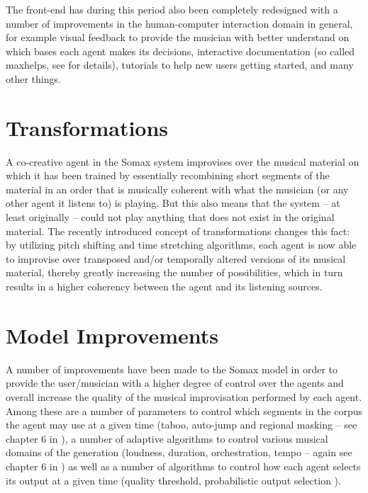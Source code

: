 \documentclass[10pt]{article}        %
\begin{document}
The front-end has during this period also been completely redesigned with a number of improvements in the human-computer interaction domain in general, for example visual feedback to provide the musician with better understand on which bases each agent makes its decisions, interactive documentation (so called maxhelps, see \cite{somaxsoftware2021} for details), tutorials to help new users getting started, and many other things.

\section{Transformations}
A co-creative agent in the Somax system improvises over the musical material on which it has been trained by essentially recombining short segments of the material in an order that is musically coherent with what the musician (or any other agent it listens to) is playing. But this also means that the system -- at least originally -- could not play anything that does not exist in the original material. The recently introduced concept of transformations \cite{somaxtheory2021} changes this fact: by utilizing pitch shifting and time stretching algorithms, each agent is now able to improvise over transposed and/or temporally altered versions of its musical material, thereby greatly increasing the number of possibilities, which in turn results in a higher coherency between the agent and its listening sources. 

\section{Model Improvements}
A number of improvements have been made to the Somax model in order to provide the user/musician with a higher degree of control over the agents and overall increase the quality of the musical improvisation performed by each agent. Among these are a number of parameters to control which segments in the corpus the agent may use at a given time (taboo, auto-jump and regional masking -- see chapter 6 in \cite{somaxtheory2021}), a number of adaptive algorithms to control various musical domains of the generation (loudness, duration, orchestration, tempo -- again see chapter 6 in \cite{somaxtheory2021}) as well as a number of algorithms to control how each agent selects its output at a given time (quality threshold, probabilistic output selection \cite{somaxtheory2021}).
\end{document}
